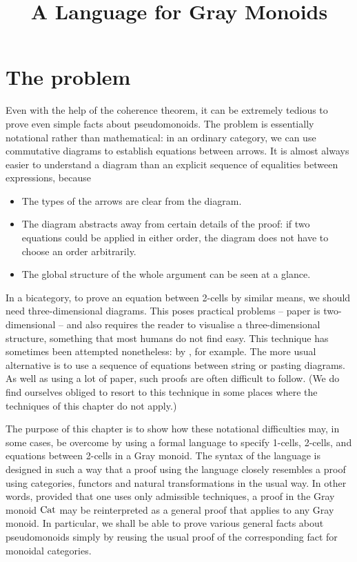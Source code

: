 \documentclass{robinthesisdraft}
\title{A Language for Gray Monoids}
\begin{document}
\maketitle
%
\section{The problem}
Even with the help of the coherence theorem, it can be extremely
tedious to prove even simple facts about pseudomonoids. The problem
is essentially notational rather than mathematical: in an ordinary
category, we can use commutative diagrams to establish equations
between arrows. It is almost always easier to understand a diagram
than an explicit sequence of equalities between expressions, because
\begin{itemize}
\item The types of the arrows are clear from the diagram.
\item The diagram abstracts away from certain details of the proof:
	if two equations could be applied in either order, the diagram
	does not have to choose an order arbitrarily.
\item The global structure of the whole argument can be seen at a glance.
\end{itemize}
In a bicategory, to prove an equation between 2-cells by similar
means, we should need three-dimensional diagrams. This poses
practical problems -- paper is two-dimensional -- and also requires
the reader to visualise a three-dimensional structure, something
that most humans do not find easy. This technique has sometimes
been attempted nonetheless: by \citet[][Section~3.4]{LackThesis},
for example.
%
The more usual alternative is to use a sequence of equations
between string or pasting diagrams. As well as using a lot
of paper, such proofs are often difficult to follow. (We do
find ourselves obliged to resort to this technique in some
places where the techniques of this chapter do not apply.)

The purpose of this chapter is to show how these notational
difficulties may, in some cases, be overcome by using a formal
language to specify 1-cells, 2-cells, and equations between 2-cells
in a Gray monoid. The syntax of the language is designed in such
a way that a proof using the language closely resembles a proof
using categories, functors and natural transformations in the usual
way. In other words, provided that one uses only admissible techniques,
a proof in the Gray monoid $\mathrm{Cat}$ may be reinterpreted
as a general proof that applies to any Gray monoid. In particular,
we shall be able to prove various general facts about pseudomonoids
simply by reusing the usual proof of the corresponding fact for
monoidal categories.
\end{document}
